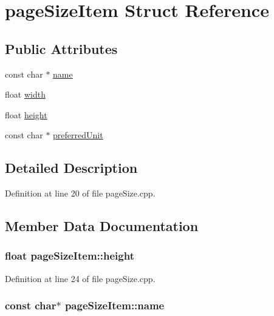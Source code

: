 \hypertarget{structpageSizeItem}{\section{page\+Size\+Item Struct Reference}
\label{structpageSizeItem}
}
\subsection*{Public Attributes}
\begin{DoxyCompactItemize}
\item 
const char $\ast$ \hyperlink{structpageSizeItem_aeabfea4a5413a25c81fa32cf0dde3d44}{name}
\item 
float \hyperlink{structpageSizeItem_a365e5c8b7ceae8e7a28b4a59bf324240}{width}
\item 
float \hyperlink{structpageSizeItem_abafd45d86c5583e39a9c4187b4c34dd7}{height}
\item 
const char $\ast$ \hyperlink{structpageSizeItem_ae5589189533a4ce5dc3d3c6a4c430581}{preferred\+Unit}
\end{DoxyCompactItemize}


\subsection{Detailed Description}


Definition at line 20 of file page\+Size.\+cpp.



\subsection{Member Data Documentation}
\hypertarget{structpageSizeItem_abafd45d86c5583e39a9c4187b4c34dd7}{
\subsubsection[{height}]{\setlength{\rightskip}{0pt plus 5cm}float page\+Size\+Item\+::height}}\label{structpageSizeItem_abafd45d86c5583e39a9c4187b4c34dd7}


Definition at line 24 of file page\+Size.\+cpp.

\hypertarget{structpageSizeItem_aeabfea4a5413a25c81fa32cf0dde3d44}{
\subsubsection[{name}]{\setlength{\rightskip}{0pt plus 5cm}const char$\ast$ page\+Size\+Item\+::name}}\label{structpageSizeItem_aeabfea4a5413a25c81fa32cf0dde3d44}


